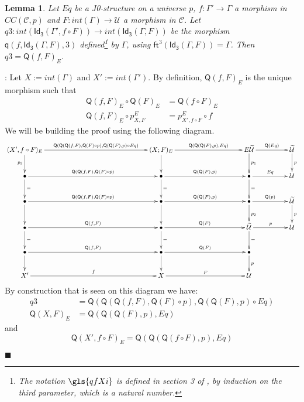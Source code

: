 \documentclass[12pt]{article}
\numberwithin{equation}{section}
\newenvironment{myproof}{{\bf Proof}:}{$\blacksquare$ \vskip 5mm }
\newtheorem{lemma}[proposition]{Lemma}
\newcommand{\sr}{\rightarrow}
\newcommand{\wt}{\widetilde}
\newcommand{\BB}{{\bullet}}
\newcommand{\toCC}{CC} %
\newcommand{\C}{{\mathcal C}}  %
\newcommand{\ft}{\mathsf{ft}}
\newcommand{\q}{\mathsf{q}}
\newcommand{\Idx}{\mathsf{Id_3}} %
\newcommand{\U}{\mathcal{U}}
\newcommand{\Q}{\mathsf{Q}}
\begin{document}
\begin{lemma}
\label{2015.04.04.l4} Let $Eq$ be a J0-structure on a universe $p$,
$f:\Gamma'\sr \Gamma$ a morphism in $\toCC({\C},p)$ and $F:int(\Gamma)\sr \U$ a morphism in $\C$.
Let $q3:int(\Idx(\Gamma',f\circ F))\sr int(\Idx(\Gamma,F))$ be the morphism $\q(f,\Idx(\Gamma,F),3)$ defined\footnote{The notation $\gls{qfXi}$
is defined in section 3 of \cite{Csubsystems}, by induction on the third parameter, which is a natural number.} by
$\Gamma$, using $\ft^3(\Idx(\Gamma,F))=\Gamma$.  Then $q3=\Q(f,F)_{E}$.
\end{lemma}
%
\begin{myproof}
Let $X:=int(\Gamma)$ and $X':=int(\Gamma')$. By definition, $\Q(f,F)_{E}$ is the
unique morphism such that
%
\begin{align*}
  \Q(f,F)_{E}\circ \Q(F)_{E}&=\Q(f\circ F)_{E} \\
  \Q(f,F)_{E}\circ p^{E}_{X,F}&=p^{E}_{X',f\circ F}\circ f
\end{align*}
%
We will be building the proof using the following diagram.
%
$$
\begin{xy}
          \xymatrix@C=4pc{ (X',f\circ F)_{E} \ar[rrr]^-{\Q(\Q(\Q(f,F),\Q(F)\circ
              p),\Q(\Q(F),p)\circ Eq)} \ar[d]_{p_3} &&& (X;F)_{E}
            \ar[rr]^-{\Q(\Q(\Q(F),p),Eq)} \ar[d] && E\wt{\U} \ar[r]^-{\Q(Eq)}
            \ar[d]^{p_1} & \wt{\U} \ar[d]^{p}\\ \BB
            \ar[rrr]^-{\Q(\Q(f,F),\Q(F)\circ p)} \ar[d]^{=} &&& \BB
            \ar[rr]^-{\Q(\Q(F),p)} \ar[d]^{=} && \BB \ar[r]^-{Eq} \ar[d]^{=}&
            \U\\ \BB \ar[rrr]^-{\Q(\Q(f,F),\Q(F)\circ p)} \ar[d] &&& \BB
            \ar[rr]^-{\Q(\Q(F),p)} \ar[d] && \BB \ar[r]^-{\Q(p)} \ar[d]^{p_2}&
            \wt{\U} \ar[d]^{p}\\ \BB \ar[rrr]^-{\Q(f,F)} \ar[d]^{=}&&& \BB
            \ar[rr]^-{\Q(F)} \ar[d]^{=} && \wt{\U} \ar[r]^-{p} \ar[d]^{=} & \U
            \\ \BB \ar[rrr]^-{\Q(f,F)} \ar[d] &&& \BB \ar[rr]^-{\Q(F)} \ar[d] &&
            \BB \ar[d]^{p}\\ X' \ar[rrr]^-{f} &&& X \ar[rr]^-{F} && \U }
\end{xy}
$$
%
By construction that is seen on this diagram we have:
%
\begin{align*}
  q3&=\Q(\Q(\Q(f,F),\Q(F)\circ p),\Q(\Q(F),p)\circ Eq) \\
  \Q(X,F)_{E}&=\Q(\Q(\Q(F),p),Eq)
\end{align*}
%
and
%
$$\Q(X', f\circ F)_{E}=\Q(\Q(\Q(f\circ F),p),Eq)$$

\end{myproof}
\end{document}
